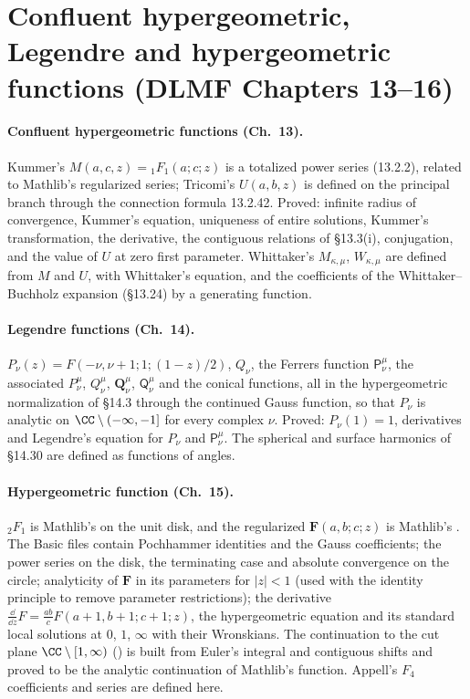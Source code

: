 \documentclass[11pt,a4paper]{article}
\newcommand{\F}{\mathbf{F}}
\begin{document}
\section{Confluent hypergeometric, Legendre and hypergeometric functions (DLMF Chapters 13--16)}

\paragraph{Confluent hypergeometric functions (Ch.~13).} Kummer's $M(a,c,z)={}_1F_1(a;c;z)$ is
a totalized power series (13.2.2), related to Mathlib's regularized series; Tricomi's $U(a,b,z)$
is defined on the principal branch through the connection formula 13.2.42. Proved: infinite
radius of convergence, Kummer's equation, uniqueness of entire solutions, Kummer's
transformation, the derivative, the contiguous relations of \S13.3(i), conjugation, and the
value of $U$ at zero first parameter. Whittaker's $M_{\kappa,\mu}$, $W_{\kappa,\mu}$ are defined
from $M$ and $U$, with Whittaker's equation, and the coefficients of the Whittaker--Buchholz
expansion (\S13.24) by a generating function.

\paragraph{Legendre functions (Ch.~14).} $P_\nu(z)=F(-\nu,\nu+1;1;(1-z)/2)$, $Q_\nu$, the
Ferrers function $\mathsf P^\mu_\nu$, the associated $P^\mu_\nu$, $Q^\mu_\nu$,
$\boldsymbol Q^\mu_\nu$, $\mathsf Q^\mu_\nu$ and the conical functions, all in the
hypergeometric normalization of \S14.3 through the continued Gauss function, so that $P_\nu$ is
analytic on $\CC\setminus(-\infty,-1]$ for every complex $\nu$. Proved: $P_\nu(1)=1$,
derivatives and Legendre's equation for $P_\nu$ and $\mathsf P^\mu_\nu$. The spherical and
surface harmonics of \S14.30 are defined as functions of angles.

\paragraph{Hypergeometric function (Ch.~15).} ${}_2F_1$ is Mathlib's 
on the unit disk, and the regularized $\F(a,b;c;z)$ is Mathlib's
. The Basic files contain Pochhammer identities and the Gauss
coefficients; the power series on the disk, the terminating case and absolute convergence on the
circle; analyticity of $\F$ in its parameters for $|z|<1$ (used with the identity principle to
remove parameter restrictions); the derivative
$\tfrac{\dd}{\dd z}F=\tfrac{ab}{c}F(a+1,b+1;c+1;z)$, the hypergeometric equation and its standard
local solutions at $0$, $1$, $\infty$ with their Wronskians. The continuation to the cut plane
$\CC\setminus[1,\infty)$ () is built from Euler's integral and contiguous
shifts and proved to be the analytic continuation of Mathlib's function. Appell's $F_4$
coefficients and series are defined here.
\end{document}
